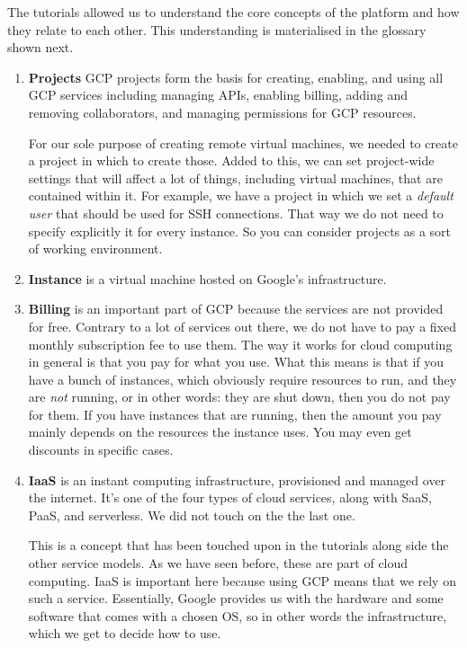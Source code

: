 The tutorials allowed us to understand the core concepts of the
platform and how they relate to each other. This understanding is
materialised in the glossary shown next.

\begin{enumerate}

	\item \textbf{Projects} GCP projects form the basis for creating,
	enabling, and using all GCP services including managing APIs,
	enabling billing, adding and removing collaborators, and managing
	permissions for GCP resources.\cite{GCP-project}
	
	For our sole purpose of creating remote virtual machines, we
	needed to create a project in which to create those.  Added to
	this, we can set project-wide settings that will affect a lot of
	things, including virtual machines, that are contained within it.
	For example, we have a project in which we set a \textit{default
	user} that should be used for SSH connections.  That way we do not
	need to specify explicitly it for every instance. So you can
	consider projects as a sort of working environment.

	\item \textbf{Instance} is a virtual machine hosted on
	Google's infrastructure.\cite{GCP-instance}

	\item \textbf{Billing} is an important part of GCP because the
	services are not provided for free. Contrary to a lot of services
	out there, we do not have to pay a fixed monthly subscription fee
	to use them. The way it works for cloud computing in general is
	that you pay for what you use. What this means is that if you have
	a bunch of instances, which obviously require resources to run,
	and they are \emph{not} running, or in other words: they are shut
	down, then you do not pay for them. If you have instances that are
	running, then the amount you pay mainly depends on the resources
	the instance uses. You may even get discounts in specific cases. 

	\item \textbf{IaaS} is an instant computing infrastructure,
	provisioned and managed over the internet. It’s one of the four
	types of cloud services, along with SaaS, PaaS, and
	serverless.\cite{IAAS} We did not touch on the the last one.
	
	This is a concept that has been touched upon in the
	tutorials along side the other service models. As we have seen
	before, these are part of cloud computing. IaaS is important here
	because using GCP means that we rely on such a service.
	Essentially, Google provides us with the hardware and some
	software that comes with a chosen OS, so in other words the
	infrastructure, which we get to decide how to use.
	 
\end{enumerate}
